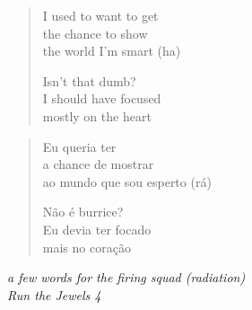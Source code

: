 \clearpage\thispagestyle{empty}\vspace*{\fill}

\begin{verse}
I used to want to get \\
the chance to show \\
the world I'm smart (ha)

Isn't that dumb? \\
I should have focused \\
mostly on the heart
\end{verse}
\begin{verse}\small
Eu queria ter \\
a chance de mostrar \\
ao mundo que sou esperto (rá)

Não é burrice? \\
Eu devia ter focado \\
mais no coração
\end{verse}
\begin{flushright}\small\itshape
a few words for the firing squad (radiation) \\
Run the Jewels 4
\end{flushright}

\vspace*{\fill}\clearpage
